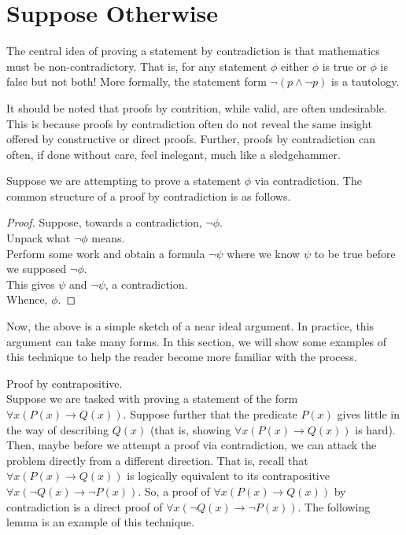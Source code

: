 \guard
\section{Suppose Otherwise}
\label{sec:supposeOtherwise}



The central idea of proving a statement by contradiction is that mathematics must be non-contradictory.
That is, for any statement $\phi$ either $\phi$ is true or $\phi$ is false but not both!
More formally, the statement form $\neg(p\wedge\neg p)$ is a tautology.

It should be noted that proofs by contrition, while valid, are often undesirable.
This is because proofs by contradiction often do not reveal the same insight offered by constructive or direct proofs.
Further, proofs by contradiction can often, if done without care, feel inelegant, much like a sledgehammer.

Suppose we are attempting to prove a statement $\phi$ via contradiction.
The common structure of a proof by contradiction is as follows.
\begin{proof}
  Suppose, towards a contradiction, $\neg\phi$.\\
  Unpack what $\neg\phi$ means.\\
  Perform some work and obtain a formula $\neg\psi$ where we know $\psi$ to be true before we supposed $\neg\phi$.\\
  This gives $\psi$ and $\neg\psi$, a contradiction.\\
  Whence, $\phi$.
\end{proof}
Now, the above is a simple sketch of a near ideal argument.
In practice, this argument can take many forms.
In this section, we will show some examples of this technique to help the reader become more familiar with the process.








Proof by contrapositive.\\
Suppose we are tasked with proving a statement of the form $\forall x( P(x)\rightarrow Q(x))$.
Suppose further that the predicate $P(x)$ gives little in the way of describing $Q(x)$ (that is, showing $\forall x( P(x)\rightarrow Q(x))$ is hard).
Then, maybe before we attempt a proof via contradiction, we can attack the problem directly from a different direction.
That is, recall that $\forall x( P(x)\rightarrow Q(x))$ is logically equivalent to its contrapositive $\forall x( \neg Q(x)\rightarrow \neg P(x))$.
So, a proof of $\forall x( P(x)\rightarrow Q(x))$ by contradiction is a direct proof of $\forall x( \neg Q(x)\rightarrow \neg P(x))$.
The following lemma is an example of this technique.

